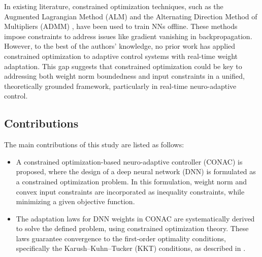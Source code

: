 \documentclass[lettersize,journal]{IEEEtran}
\begin{document}
In existing literature, constrained optimization techniques, such as the Augmented Lagrangian Method (ALM) \cite{Evens:2021aa} and the Alternating Direction Method of Multipliers (ADMM) \cite{Wang:2019aa,Taylor:2016aa}, have been used to train NNs offline. 
These methods impose constraints to address issues like gradient vanishing in backpropagation. 
However, to the best of the authors' knowledge, no prior work has applied constrained optimization to adaptive control systems with real-time weight adaptation. 
This gap suggests that constrained optimization could be key to addressing both weight norm boundedness and input constraints in a unified, theoretically grounded framework, particularly in real-time neuro-adaptive control.

\subsection{Contributions}


The main contributions of this study are listed as follows:
\begin{itemize}
    \item A constrained optimization-based neuro-adaptive controller (CONAC) is proposed, where the design of a deep neural network (DNN) is formulated as a constrained optimization problem. In this formulation, weight norm and convex input constraints are incorporated as inequality constraints, while minimizing a given objective function.
    \item The adaptation laws for DNN weights in CONAC are systematically derived to solve the defined problem, using constrained optimization theory. These laws guarantee convergence to the first-order optimality conditions, specifically the Karush–Kuhn–Tucker (KKT) conditions, as described in \cite[Chap. 12 Thm. 12.1]{Nocedal:2006aa}.
\end{itemize}
\end{document}
